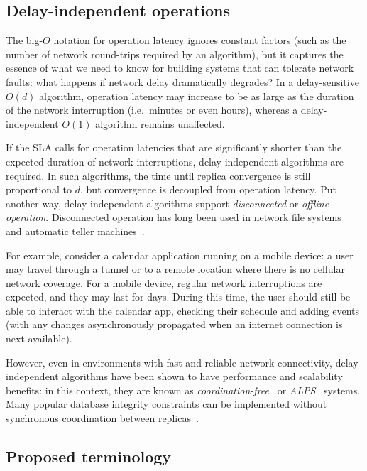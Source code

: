 \documentclass[a4paper,twocolumn,10pt]{article}
\begin{document}
\subsection{Delay-independent operations}\label{sec:disconnected}

The big-$O$ notation for operation latency ignores constant factors (such as the number of network
round-trips required by an algorithm), but it captures the essence of what we need to know for
building systems that can tolerate network faults: what happens if network delay dramatically
degrades? In a delay-sensitive $O(d)$ algorithm, operation latency may increase to be as large as
the duration of the network interruption (i.e.\ minutes or even hours), whereas a delay-independent
$O(1)$ algorithm remains unaffected.

If the SLA calls for operation latencies that are significantly shorter than the expected duration
of network interruptions, delay-independent algorithms are required. In such algorithms, the time
until replica convergence is still proportional to $d$, but convergence is decoupled from operation
latency. Put another way, delay-independent algorithms support \emph{disconnected} or \emph{offline
operation}. Disconnected operation has long been used in network file systems~\cite{Kistler1992bt}
and automatic teller machines~\cite{Brewer2012tr}.

For example, consider a calendar application running on a mobile device: a user may travel through a
tunnel or to a remote location where there is no cellular network coverage. For a mobile device,
regular network interruptions are expected, and they may last for days. During this time, the user
should still be able to interact with the calendar app, checking their schedule and adding events
(with any changes asynchronously propagated when an internet connection is next available).

However, even in environments with fast and reliable network connectivity, delay-independent
algorithms have been shown to have performance and scalability benefits: in this context, they are
known as \emph{coordination-free}~\cite{Bailis2014th} or \emph{ALPS}~\cite{Lloyd2011hz} systems.
Many popular database integrity constraints can be implemented without synchronous coordination
between replicas~\cite{Bailis2014th}.

\subsection{Proposed terminology}\label{sec:terminology}
\end{document}
